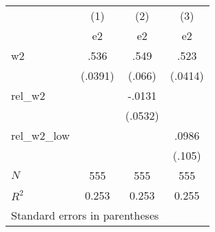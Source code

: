 \begin{tabular}{l*{3}{c}}
\hline\hline
            &\multicolumn{1}{c}{(1)}&\multicolumn{1}{c}{(2)}&\multicolumn{1}{c}{(3)}\\
            &\multicolumn{1}{c}{e2}&\multicolumn{1}{c}{e2}&\multicolumn{1}{c}{e2}\\
\hline
w2          &        .536&        .549&        .523\\
            &     (.0391)&      (.066)&     (.0414)\\
[1em]
rel\_w2      &            &      -.0131&            \\
            &            &     (.0532)&            \\
[1em]
rel\_w2\_low  &            &            &       .0986\\
            &            &            &      (.105)\\
\hline
\(N\)       &         555&         555&         555\\
\(R^{2}\)   &       0.253&       0.253&       0.255\\
\hline\hline
\multicolumn{4}{l}{\footnotesize Standard errors in parentheses}\\
\end{tabular}
